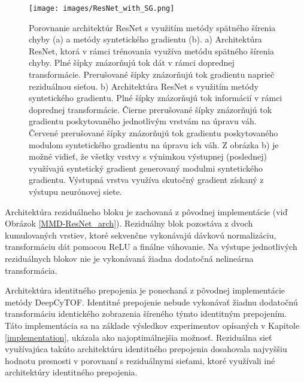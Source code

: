 \begin{figure}

\centerline{\texttt{[image: images/ResNet\_with\_SG.png]}}
\caption[Reziduálna sieť s implementovaným algoritmom syntetického gradientu]{Porovnanie architektúr ResNet s využitím metódy spätného šírenia chyby (a) a metódy syntetického gradientu (b). a) Architektúra ResNet, ktorá v rámci trénovania využíva metódu spätného šírenia chyby. Plné šípky znázorňujú tok dát v rámci doprednej transformácie. Prerušované šípky znázorňujú tok gradientu naprieč reziduálnou sieťou. b) Architektúra ResNet s využitím metódy syntetického gradientu. Plné šípky znázorňujú tok informácií v rámci doprednej transformácie. Čierne prerušované šípky znázorňujú tok gradientu poskytovaného jednotlivým vrstvám na úpravu váh. Červené prerušované šípky znázorňujú tok gradientu poskytovaného modulom syntetického gradientu na úpravu ich váh. Z obrázka b) je možné vidieť, že všetky vrstvy s výnimkou výstupnej (poslednej) využívajú syntetický gradient generovaný modulmi syntetického gradientu. Výstupná vrstva využíva skutočný gradient získaný z výstupu neurónovej siete.}
\label{fig:ResNetWithSG}
\end{figure}


Architektúra reziduálneho bloku je zachovaná z pôvodnej implementácie (viď Obrázok \ref{MMD-ResNet_arch}). Reziduálny blok pozostáva z dvoch kumulovaných vrstiev, ktoré sekvenčne vykonávajú dávkovú normalizáciu, transformáciu dát pomocou ReLU a finálne váhovanie. Na výstupe jednotlivých reziduálnych blokov nie je vykonávaná žiadna dodatočná nelineárna transformácia.

Architektúra identitného prepojenia je ponechaná z pôvodnej implementácie metódy DeepCyTOF. Identitné prepojenie nebude vykonávať žiadnu dodatočnú transformáciu identického zobrazenia šíreného týmto identitným prepojením. Táto implementácia sa na základe výsledkov experimentov opísaných v Kapitole \ref{implementation}, ukázala ako najoptimálnejšia možnosť. Reziduálna sieť využívajúca takúto architektúru identitného prepojenia dosahovala najvyššiu hodnotu presnosti v porovnaní s reziduálnymi sieťami, ktoré využívali iné architektúry identitného prepojenia.


